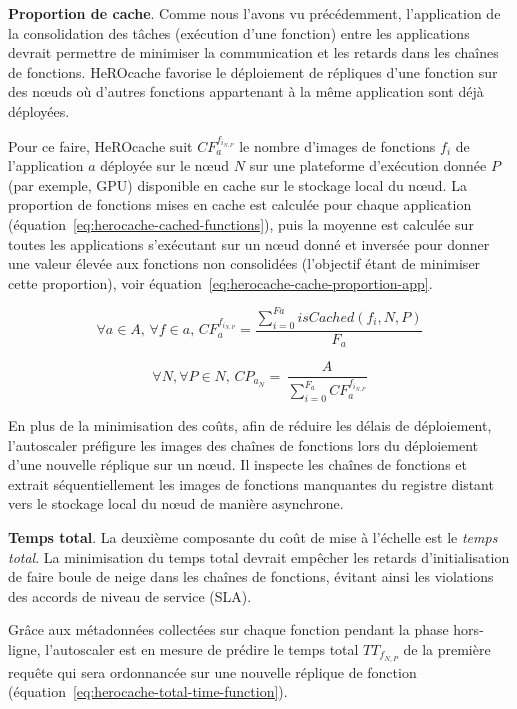\textbf{Proportion de cache}. Comme nous l'avons vu précédemment, l'application de la consolidation des tâches (exécution d'une fonction) entre les applications devrait permettre de minimiser la communication et les retards dans les chaînes de fonctions. HeROcache favorise le déploiement de répliques d'une fonction sur des nœuds où d'autres fonctions appartenant à la même application sont déjà déployées.

Pour ce faire, HeROcache suit $CF_{a}^{{f}_{i_{N, P}}}$ le nombre d'images de fonctions ${f}_{i}$ de l'application $a$ déployée sur le nœud $N$ sur une plateforme d'exécution donnée $P$ (par exemple, GPU) disponible en cache sur le stockage local du nœud. La proportion de fonctions mises en cache est calculée pour chaque application (équation~\ref{eq:herocache-cached-functions}), puis la moyenne est calculée sur toutes les applications s'exécutant sur un nœud donné et inversée pour donner une valeur élevée aux fonctions non consolidées (l'objectif étant de minimiser cette proportion), voir équation~\ref{eq:herocache-cache-proportion-app}.

\begin{equation}
    \forall a \in A, \, \forall f \in a, \, CF_{a}^{{f}_{i_{N, P}}} = \frac{\sum_{i = 0}^{Fa} isCached(f_{i}, N, P)}{F_{a}}
\label{eq:herocache-cached-functions}
\end{equation}

\begin{equation}
    \forall N, \forall P \in N, \, {CP}_{{a}_{N}} = \, \frac{A}{\sum_{i = 0}^{F_{a}} CF_{a}^{{f}_{i_{N, P}}}}
\label{eq:herocache-cache-proportion-app}
\end{equation}

En plus de la minimisation des coûts, afin de réduire les délais de déploiement, l'autoscaler préfigure les images des chaînes de fonctions lors du déploiement d'une nouvelle réplique sur un nœud. Il inspecte les chaînes de fonctions et extrait séquentiellement les images de fonctions manquantes du registre distant vers le stockage local du nœud de manière asynchrone.

\textbf{Temps total}. La deuxième composante du coût de mise à l'échelle est le \textit{temps total}. La minimisation du temps total devrait empêcher les retards d'initialisation de faire boule de neige dans les chaînes de fonctions, évitant ainsi les violations des accords de niveau de service (SLA).

Grâce aux métadonnées collectées sur chaque fonction pendant la phase hors-ligne, l'autoscaler est en mesure de prédire le temps total ${TT}_{{f}_{N, P}}$ de la première requête qui sera ordonnancée sur une nouvelle réplique de fonction (équation~\ref{eq:herocache-total-time-function}).

